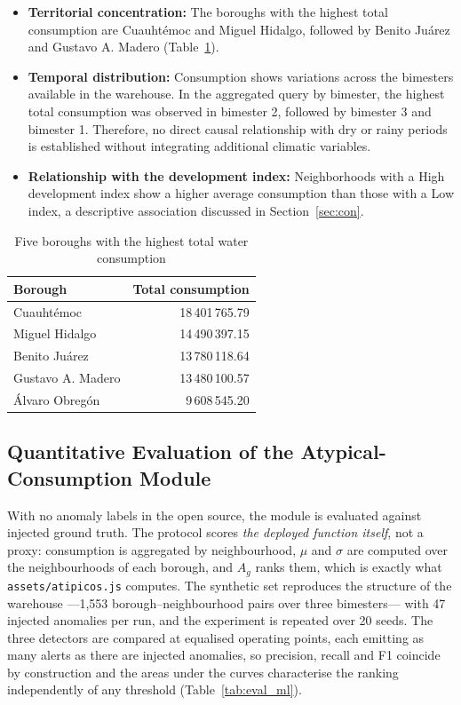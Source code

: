 \documentclass[runningheads]{llncs}
\newif\ifmarcarcambios
\newcommand{\icokg}[1]{\ifmarcarcambios\textcolor{nuevo}{#1}\else#1\fi}
\renewcommand{\_}{\origunderscore\allowbreak}
\begin{document}
\begin{itemize}
    \item \textbf{Territorial concentration:} The boroughs with the highest total consumption are Cuauht\'emoc and Miguel Hidalgo, followed by Benito Ju\'arez and Gustavo A. Madero (Table~\ref{tab:top5_alcaldias}).
    \item \textbf{Temporal distribution:} Consumption shows variations across the bimesters available in the warehouse. In the aggregated query by bimester, the highest total consumption was observed in bimester 2, followed by bimester 3 and bimester 1. Therefore, no direct causal relationship with dry or rainy periods is established without integrating additional climatic variables.
    \item \textbf{Relationship with the development index:} Neighborhoods with a High development index show a higher average consumption than those with a Low index, a descriptive association discussed in Section~\ref{sec:con}.
\end{itemize}

\begin{table}[tbp]
\centering
\caption{Five boroughs with the highest total water consumption}
\label{tab:top5_alcaldias}
\begin{tabular}{|l|r|}
\hline
\textbf{Borough} & \textbf{Total consumption} \\
\hline
Cuauht\'emoc & 18\,401\,765.79 \\
Miguel Hidalgo & 14\,490\,397.15 \\
Benito Ju\'arez & 13\,780\,118.64 \\
Gustavo A. Madero & 13\,480\,100.57 \\
\'Alvaro Obreg\'on & 9\,608\,545.20 \\
\hline
\end{tabular}
\end{table}



\subsection{Quantitative Evaluation of the Atypical-Consumption Module}

With no anomaly labels in the open source, the module is evaluated against
injected ground truth. \icokg{The protocol scores \emph{the deployed
function itself}, not a proxy: consumption is aggregated by neighbourhood, $\mu$
and $\sigma$ are computed over the neighbourhoods of each borough, and $A_g$
ranks them, which is exactly what \texttt{assets/atipicos.js} computes. The
synthetic set reproduces the structure of the warehouse ---1,553
borough--neighbourhood pairs over three bimesters--- with 47 injected anomalies
per run, and the experiment is repeated over 20 seeds. The three detectors are
compared at equalised operating points, each emitting as many alerts as there are
injected anomalies, so precision, recall and F1 coincide by construction and the
areas under the curves characterise the ranking independently of any threshold
(Table~\ref{tab:eval_ml}).}
\end{document}
